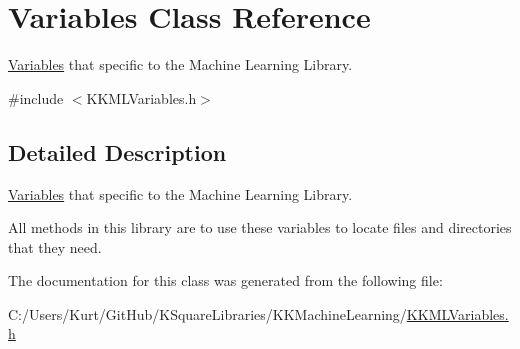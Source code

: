 \hypertarget{class_variables}{}\section{Variables Class Reference}
\label{class_variables}


\hyperlink{class_variables}{Variables} that specific to the Machine Learning Library.  




{\ttfamily \#include $<$K\+K\+M\+L\+Variables.\+h$>$}



\subsection{Detailed Description}
\hyperlink{class_variables}{Variables} that specific to the Machine Learning Library. 

All methods in this library are to use these variables to locate files and directories that they need. 

The documentation for this class was generated from the following file\+:\begin{DoxyCompactItemize}
\item 
C\+:/\+Users/\+Kurt/\+Git\+Hub/\+K\+Square\+Libraries/\+K\+K\+Machine\+Learning/\hyperlink{_k_k_m_l_variables_8h}{K\+K\+M\+L\+Variables.\+h}\end{DoxyCompactItemize}
